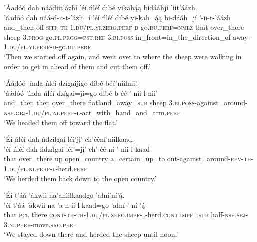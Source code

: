 \ea\label{ex:text6-5-18}
’Áadóó dah náádiit’ázhí ’éí ńléí dibé yikahą́ą bidááhjí ’iit’áázh.\\
\gll ’áadóó	dah	náá-d-ii-t-’ázh=í	’éí	ńléí	dibé	yi-kah=ą́ą	bi-dááh=jí	’-ii-t-’áázh\\
     and\_then	off	\textsc{sitr}-\textsc{th}-1.\textsc{du}/\textsc{pl}.\textsc{yi}.\textsc{zero}.\textsc{perf}-\textsc{d}-go.\textsc{du}.\textsc{perf}=\textsc{nmlz}	that	over\_there	sheep	3.\textsc{prog}-go.\textsc{pl}.\textsc{prog}=\textsc{pst}.\textsc{ref}	3.\textsc{bi}.\textsc{poss}-in\_front=in\_the\_direction\_of	away-1.\textsc{du}/\textsc{pl}.\textsc{yi}.\textsc{perf}-\textsc{d}-go.\textsc{du}.\textsc{perf}\\
\glt `Then we started off again, and went over to where the sheep were walking in order to get in ahead of them and cut them off.'
\z

\ea\label{ex:text6-5-19}
’Áádóó ’índa ńléí dzígaijigo dibé béé’niilnii’.\\
\gll ’áádóó	’índa	ńléí	dzígai=ji=go	dibé	b-éé-’-nii-l-nii’\\
     and\_then	then	over\_there	flatland=away=\textsc{sub}	sheep	3.\textsc{bi}.\textsc{poss}-against\_around-\textsc{nsp}.\textsc{obj}-1.\textsc{du}/\textsc{pl}.\textsc{ni}.\textsc{perf}-\textsc{l}-act\_with\_hand\_and\_arm.\textsc{perf}\\
\glt `We headed them off toward the flat.'
\z

\newpage
\ea\label{ex:text6-5-20}
’Éí ńléí dah ńdzílgai léi’jį’ ch’ééní’niilkaad.\\
\gll ’éí	ńléí	dah	ńdzílgai	léi’=jį’	ch’-éé-ní-’-nii-l-kaad\\
     that	over\_there	up	open\_country	a\_certain=up\_to	out-against\_around-\textsc{rev}-\textsc{th}-1.\textsc{du}/\textsc{pl}.\textsc{ni}.\textsc{perf}-\textsc{l}-herd.\textsc{perf}\\
\glt `We herded them back down to the open country.'
\z

\ea\label{ex:text6-5-21}
’Éí t’áá ’ákwii na’aniilkaadgo ’ałní’ní’ą́.\\
\gll ’éí	t’áá	’ákwii	na-’a-n-ii-l-kaad=go	’ałní-’-ní-’ą́\\
     that	\textsc{pcl}	there	\textsc{cont}-\textsc{th}-\textsc{th}-1.\textsc{du}/\textsc{pl}.\textsc{zero}.\textsc{impf}-\textsc{l}-herd.\textsc{cont}.\textsc{impf}=\textsc{sub}	half-\textsc{nsp}.\textsc{sbj}-3.\textsc{ni}.\textsc{perf}-move.\textsc{sro}.\textsc{perf}\\
\glt `We stayed down there and herded the sheep until noon.'
\z

